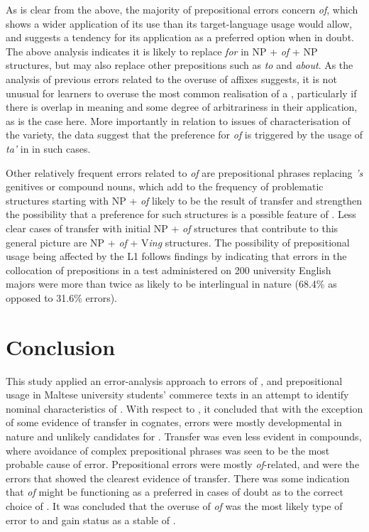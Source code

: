 \documentclass[output=paper]{langsci/langscibook}
\begin{document}
As is clear from the above, the majority of prepositional errors
concern \textit{of}, which shows a wider application of its use than
its target-language usage would allow, and suggests a tendency for its
application as a preferred option when in doubt. The above analysis
indicates it is likely to replace \textit{for} in NP + \textit{of} +
NP structures, but may also replace other prepositions such as
\textit{to} and \textit{about}. As the analysis of previous errors
related to the overuse of affixes suggests, it is not unusual for
learners to overuse the most common realisation of a ,
particularly if there is overlap in meaning and some degree of
arbitrariness in their application, as is the case here. More
importantly in relation to issues of characterisation of the variety,
the data suggest that the preference for \textit{of} is triggered by
the usage of \textit{ta’} in  in such cases.



Other relatively frequent errors related to \textit{of}  are 
prepositional phrases replacing \textit{’s} genitives or compound
nouns, which add to the frequency of problematic structures starting
with NP + \textit{of} likely to be the result of transfer and
strengthen the possibility that a preference for such structures is a
possible feature of . Less clear cases of transfer with
initial NP + \textit{of} structures that contribute to this general
picture are NP + \textit{of} + V\textit{ing} structures. The
possibility of prepositional usage being affected by the L1 follows
findings by  \citet{KooshaJafarpour2006} indicating that errors in
the collocation of prepositions in a test administered on 200 
university English majors were more than twice as likely to be
interlingual in nature (68.4\% as opposed to 31.6\% 
errors).


\section{Conclusion}

This study applied an error-analysis approach to errors of ,
 and prepositional usage in Maltese university students’
commerce texts in an attempt to identify nominal characteristics of
. With respect to , it concluded that with
the exception of some evidence of transfer in cognates, 
errors were mostly developmental in nature and unlikely candidates for
. Transfer was even less evident in  compounds, where
avoidance of complex prepositional phrases was seen to be the most
probable cause of error. Prepositional errors were mostly
\textit{of}{}-related, and were the errors that showed the clearest
evidence of transfer. There was some indication that \textit{of} might
be functioning as a preferred  in cases of doubt as to the
correct choice of . It was concluded that the overuse of
\textit{of} was the most likely type of error to  and gain
status as a stable  of .
\end{document}
